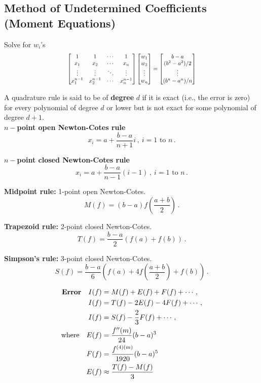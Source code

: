 \documentclass[9pt]{article}
\begin{document}
\begin{multicols}{3}
\subsection*{Method of Undetermined Coefficients (Moment Equations)}
Solve for $w_i$'s
\[
\scalebox{0.8}{$
\begin{bmatrix}
    1 & 1 & \cdots & 1\\
    x_1 & x_2 & \cdots & x_n\\
    \vdots & \vdots & \ddots & \vdots\\
    x_1^{n-1} & x_2^{n-1} & \cdots & x_n^{n-1}
\end{bmatrix}
\begin{bmatrix}
    w_1\\
    w_2\\
    \vdots\\
    w_n
\end{bmatrix}
=
\begin{bmatrix}
    b-a\\
    (b^2 - a^2)/2\\
    \vdots\\
    (b^n - a^n)/n
\end{bmatrix}
$}
\]

A quadrature rule is said to be of \textbf{degree} $d$ if it is exact (i.e., the error is zero) for every polynomial of degree $d$ or lower but is not exact for some polynomial of degree $d+1$.
\\

$n-$\textbf{point open Newton-Cotes rule} \[
x_i = a + \frac{b-a}{n+1}i \, , \ i= 1 \text{ to } n \, .
\]

$n-$\textbf{point closed Newton-Cotes rule} 
\[
x_i = a + \frac{b-a}{n-1}(i-1) \, , \ i= 1 \text{ to } n \, .
\]


\textbf{Midpoint rule:} 1-point open Newton-Cotes.
\[
M(f) = (b-a)f\left(\frac{a+b}{2}\right) \, .
\]


\textbf{Trapezoid rule:} 2-point closed Newton-Cotes.
\[
T(f) = \frac{b-a}{2} (f(a) + f(b)) \, .
\]

\textbf{Simpson's rule:} 3-point closed Newton-Cotes.
\[
S(f) = \frac{b-a}{6} \left( f(a) + 4f\left(\frac{a+b}{2}\right) + f(b) \right) \, .
\]

\hdashrule{\linewidth}{0.5pt}{0.2mm 1mm}
\[
\begin{aligned}
    \text{\textbf{Error}} \quad I(f) &= M(f) + E(f) + F(f) + \cdots \, ,\\
    I(f) &= T(f) - 2E(f) - 4F(f) + \cdots \, ,\\
    I(f) &= S(f) -\frac{2}{3}F(f) + \cdots \, ,\\
    \text{where} \quad E(f) &= \frac{f''(m)}{24}(b-a)^3 \\
    F(f) &= \frac{f^{(4)(m)}}{1920}(b-a)^5 \\
    E(f) &\approx \frac{T(f) - M(f)}{3}
\end{aligned}
\]


\end{multicols}
\end{document}
